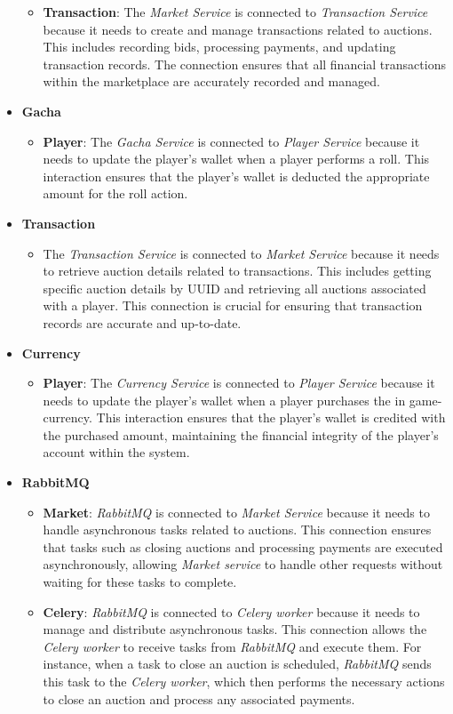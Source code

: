 \documentclass{article}
\begin{document}
\begin{itemize}
\begin{itemize}
            \item \textbf{Transaction}: The \emph{Market Service} is connected to \emph{Transaction Service} because it needs to create and manage transactions related to auctions. This includes recording bids, processing payments, and updating transaction records. The connection ensures that all financial transactions within the marketplace are accurately recorded and managed.
        \end{itemize}
    \item \textbf{Gacha}
    \begin{itemize}
        \item \textbf{Player}: The \emph{Gacha Service} is connected to \emph{Player Service} because it needs to update the player's wallet when a player performs a roll. This interaction ensures that the player's wallet is deducted the appropriate amount for the roll action.
    \end{itemize}
    \item \textbf{Transaction}
    \begin{itemize}
        \item The \emph{Transaction Service} is connected to \emph{Market Service} because it needs to retrieve auction details related to transactions. This includes getting specific auction details by UUID and retrieving all auctions associated with a player. This connection is crucial for ensuring that transaction records are accurate and up-to-date.
    \end{itemize}
    \item \textbf{Currency}
    \begin{itemize}
        \item \textbf{Player}: The \emph{Currency Service} is connected to \emph{Player Service} because it needs to update the player's wallet when a player purchases the in game-currency. This interaction ensures that the player's wallet is credited with the purchased amount, maintaining the financial integrity of the player's account within the system.
    \end{itemize}
    \item \textbf{RabbitMQ}
    \begin{itemize}
        \item \textbf{Market}: \emph{RabbitMQ} is connected to \emph{Market Service} because it needs to handle asynchronous tasks related to auctions. This connection ensures that tasks such as closing auctions and processing payments are executed asynchronously, allowing \emph{Market service} to handle other requests without waiting for these tasks to complete.
\item \textbf{Celery}: \emph{RabbitMQ} is connected to \emph{Celery worker} because it needs to manage and distribute asynchronous tasks. This connection allows the \emph{Celery worker} to receive tasks from \emph{RabbitMQ} and execute them. For instance, when a task to close an auction is scheduled, \emph{RabbitMQ} sends this task to the \emph{Celery worker}, which then performs the necessary actions to close an auction and process any associated payments.
    \end{itemize}
\end{itemize}
\end{document}
